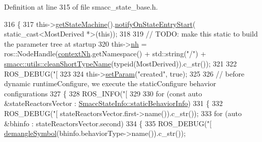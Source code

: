 Definition at line 315 of file smacc\+\_\+state\+\_\+base.\+h.


\begin{DoxyCode}
316     \{
317       this->\hyperlink{classsmacc_1_1SmaccState_afc39f8e0ca4001b2159a100da2fccd0e}{getStateMachine}().\hyperlink{classsmacc_1_1ISmaccStateMachine_aeec54e997d715b105ebfeb5caadc4fbf}{notifyOnStateEntryStart}(
      static\_cast<MostDerived *>(\textcolor{keyword}{this}));
318 
319       \textcolor{comment}{// TODO: make this static to build the parameter tree at startup}
320       this->\hyperlink{classsmacc_1_1ISmaccState_a13fe6e6abfdb87996402189d44b78494}{nh} = ros::NodeHandle(\hyperlink{classsmacc_1_1ISmaccState_ae59191a663a08489b7d10036f3b25238}{contextNh}.getNamespace() + std::string(\textcolor{stringliteral}{"/"}) + 
      \hyperlink{namespacesmacc_1_1utils_aacd1975bb7cd9bec4b50e111a2ae7edb}{smacc::utils::cleanShortTypeName}(\textcolor{keyword}{typeid}(MostDerived)).c\_str());
321 
322       ROS\_DEBUG(\textcolor{stringliteral}{"[%
323 
324       this->\hyperlink{classsmacc_1_1ISmaccState_a0b6c531ca8c446052022308548f55b92}{setParam}(\textcolor{stringliteral}{"created"}, \textcolor{keyword}{true});
325 
326       \textcolor{comment}{// before dynamic runtimeConfigure, we execute the staticConfigure behavior configurations}
327       \{
328         ROS\_INFO(\textcolor{stringliteral}{"[%
329 
330         \textcolor{keywordflow}{for} (\textcolor{keyword}{const} \textcolor{keyword}{auto} &stateReactorsVector : 
      \hyperlink{classsmacc_1_1introspection_1_1SmaccStateInfo_ad3d8b3450060cb0b91f38fb2fe0a7678}{SmaccStateInfo::staticBehaviorInfo})
331         \{
332           ROS\_DEBUG(\textcolor{stringliteral}{"[%
      stateReactorsVector.first->name()).c\_str());
333           \textcolor{keywordflow}{for} (\textcolor{keyword}{auto} &bhinfo : stateReactorsVector.second)
334           \{
335             ROS\_DEBUG(\textcolor{stringliteral}{"[%
      \hyperlink{namespacesmacc_1_1introspection_a2f495108db3e57604d8d3ff5ef030302}{demangleSymbol}(bhinfo.behaviorType->name()).c\_str());
}}}}
\end{DoxyCode}

